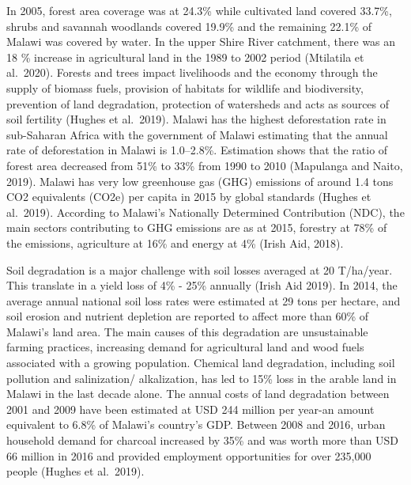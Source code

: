 \documentclass[
]{book}
\begin{document}
In 2005, forest area coverage was at 24.3\% while cultivated land covered 33.7\%, shrubs and savannah woodlands covered 19.9\% and the remaining 22.1\% of Malawi was covered by water. In the upper Shire River catchment, there was an 18 \% increase in agricultural land in the 1989 to 2002 period (Mtilatila et al.~2020). Forests and trees impact livelihoods and the economy through the supply of biomass fuels, provision of habitats for wildlife and biodiversity, prevention of land degradation, protection of watersheds and acts as sources of soil fertility (Hughes et al.~2019). Malawi has the highest deforestation rate in sub-Saharan Africa with the government of Malawi estimating that the annual rate of deforestation in Malawi is 1.0--2.8\%. Estimation shows that the ratio of forest area decreased from 51\% to 33\% from 1990 to 2010 (Mapulanga and Naito, 2019). Malawi has very low greenhouse gas (GHG) emissions of around 1.4 tons CO2 equivalents (CO2e) per capita in 2015 by global standards (Hughes et al.~2019). According to Malawi's Nationally Determined Contribution (NDC), the main sectors contributing to GHG emissions are as at 2015, forestry at 78\% of the emissions, agriculture at 16\% and energy at 4\% (Irish Aid, 2018).

Soil degradation is a major challenge with soil losses averaged at 20 T/ha/year. This translate in a yield loss of 4\% - 25\% annually (Irish Aid 2019). In 2014, the average annual national soil loss rates were estimated at 29 tons per hectare, and soil erosion and nutrient depletion are reported to affect more than 60\% of Malawi's land area. The main causes of this degradation are unsustainable farming practices, increasing demand for agricultural land and wood fuels associated with a growing population. Chemical land degradation, including soil pollution and salinization/ alkalization, has led to 15\% loss in the arable land in Malawi in the last decade alone. The annual costs of land degradation between 2001 and 2009 have been estimated at USD 244 million per year-an amount equivalent to 6.8\% of Malawi's country's GDP. Between 2008 and 2016, urban household demand for charcoal increased by 35\% and was worth more than USD 66 million in 2016 and provided employment opportunities for over 235,000 people (Hughes et al.~2019).
\end{document}
